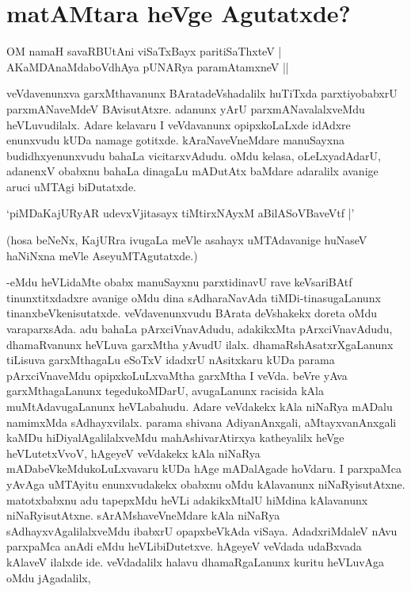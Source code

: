 \chapter{matAMtara heVge Agutatxde?}

\begin{shloka}
OM namaH savaRBUtAni viSaTxBayx paritiSaThxteV |\\
AKaMDAnaMdaboVdhAya pUNARya paramAtamxneV ||
\end{shloka}

veVdavenunxva garxMthavanunx BAratadeVshadalilx huTiTxda parxtiyobabxrU parxmANaveMdeV BAvisutAtxre. adanunx yArU parxmANavalalxveMdu heVLuvudilalx. Adare kelavaru I veVdavanunx opipxkoLaLxde idAdxre enunxvudu kUDa namage gotitxde. kAraNaveVneMdare manuSayxna budidhxyenunxvudu bahaLa vicitarxvAdudu. oMdu kelasa, oLeLxyadAdarU, adanenxV obabxnu bahaLa dinagaLu mADutAtx baMdare adaralilx avanige aruci uMTAgi biDutatxde.

\begin{shloka}
`piMDaKajURyAR udevxVjitasayx tiMtirxNAyxM aBilASoVBaveVtf |'
\end{shloka}

(hosa beNeNx, KajURra ivugaLa meVle asahayx uMTAdavanige huNaseV haNiNxna meVle AseyuMTAgutatxde.)

-eMdu heVLidaMte obabx manuSayxnu parxtidinavU rave keVsariBAtf tinunxtitxdadxre avanige oMdu dina sAdharaNavAda tiMDi-tinasugaLanunx tinanxbeVkenisutatxde. veVdavenunxvudu BArata deVshakekx doreta oMdu varaparxsAda. adu bahaLa pArxciVnavAdudu, adakikxMta pArxciVnavAdudu, dhamaRvanunx heVLuva garxMtha yAvudU ilalx. dhamaRshAsatxrXgaLanunx tiLisuva garxMthagaLu eSoTxV idadxrU nAsitxkaru kUDa parama pArxciVnaveMdu opipxkoLuLxvaMtha garxMtha I veVda. beVre yAva garxMthagaLanunx tegedukoMDarU, avugaLanunx racisida kAla muMtAdavugaLanunx heVLabahudu. Adare veVdakekx kAla niNaRya mADalu namimxMda sAdhayxvilalx. parama shivana AdiyanAnxgali, aMtayxvanAnxgali kaMDu hiDiyalAgalilalxveMdu mahAshivarAtirxya katheyalilx heVge heVLutetxVvoV, hAgeyeV veVdakekx kAla niNaRya mADabeVkeMdukoLuLxvavaru kUDa hAge mADalAgade hoVdaru. I parxpaMca yAvAga uMTAyitu enunxvudakekx obabxnu oMdu kAlavanunx niNaRyisutAtxne. matotxbabxnu adu tapepxMdu heVLi adakikxMtalU hiMdina kAlavanunx niNaRyisutAtxne. sArAMshaveVneMdare kAla niNaRya sAdhayxvAgalilalxveMdu ibabxrU opapxbeVkAda viSaya. AdadxriMdaleV nAvu parxpaMca anAdi eMdu heVLibiDutetxve. hAgeyeV veVdada udaBxvada kAlaveV ilalxde ide. veVdadalilx halavu dhamaRgaLanunx kuritu heVLuvAga oMdu jAgadalilx, 

